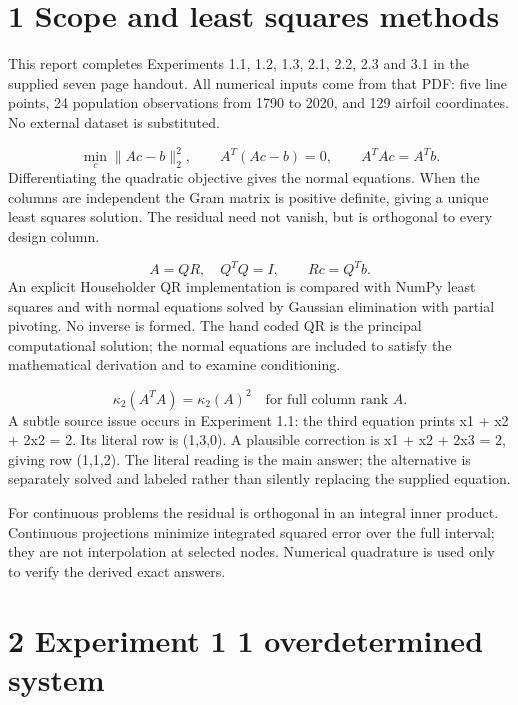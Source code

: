 \documentclass[a4paper,11pt]{article}
\begin{document}
\section*{1 Scope and least squares methods}
This report completes Experiments 1.1, 1.2, 1.3, 2.1, 2.2, 2.3 and 3.1 in the supplied seven page handout. All numerical inputs come from that PDF: five line points, 24 population observations from 1790 to 2020, and 129 airfoil coordinates. No external dataset is substituted.

\[\min_c\|Ac-b\|_2^2,\qquad A^T(Ac-b)=0,\qquad A^TAc=A^Tb.\]
Differentiating the quadratic objective gives the normal equations. When the columns are independent the Gram matrix is positive definite, giving a unique least squares solution. The residual need not vanish, but is orthogonal to every design column.

\[A=QR,\quad Q^TQ=I,\qquad Rc=Q^Tb.\]
An explicit Householder QR implementation is compared with NumPy least squares and with normal equations solved by Gaussian elimination with partial pivoting. No inverse is formed. The hand coded QR is the principal computational solution; the normal equations are included to satisfy the mathematical derivation and to examine conditioning.

\[\kappa_2(A^TA)=\kappa_2(A)^2\quad\text{for full column rank }A.\]
A subtle source issue occurs in Experiment 1.1: the third equation prints x1 + x2 + 2x2 = 2. Its literal row is (1,3,0). A plausible correction is x1 + x2 + 2x3 = 2, giving row (1,1,2). The literal reading is the main answer; the alternative is separately solved and labeled rather than silently replacing the supplied equation.

For continuous problems the residual is orthogonal in an integral inner product. Continuous projections minimize integrated squared error over the full interval; they are not interpolation at selected nodes. Numerical quadrature is used only to verify the derived exact answers.

\clearpage
\section*{2 Experiment 1 1 overdetermined system}
\end{document}
